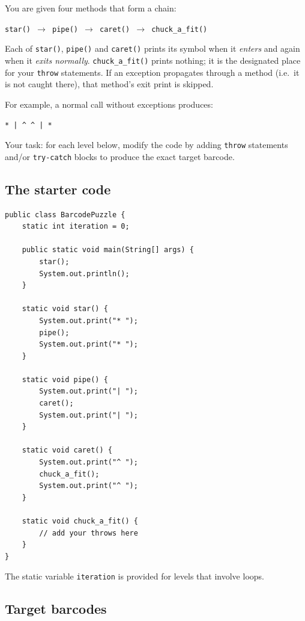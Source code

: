 \documentclass[twoside=false,DIV=14]{scrartcl}
\begin{document}
You are given four methods that form a chain:

\begin{center}
\texttt{star() $\rightarrow$ pipe() $\rightarrow$ caret() $\rightarrow$ chuck\_a\_fit()}
\end{center}

Each of \texttt{star()}, \texttt{pipe()} and \texttt{caret()} prints its symbol when it \emph{enters} and again when it \emph{exits normally}.  \texttt{chuck\_a\_fit()} prints nothing; it is the designated place for your \texttt{throw} statements.  If an exception propagates through a method (i.e.\ it is not caught there), that method's exit print is skipped.

For example, a normal call without exceptions produces:

\begin{center}
\texttt{* | \^{} \^{} | *}
\end{center}

Your task: for each level below, modify the code by adding \texttt{throw} statements and/or \texttt{try-catch} blocks to produce the exact target barcode.

\subsection*{The starter code}

\begin{lstlisting}
public class BarcodePuzzle {
    static int iteration = 0;

    public static void main(String[] args) {
        star();
        System.out.println();
    }

    static void star() {
        System.out.print("* ");
        pipe();
        System.out.print("* ");
    }

    static void pipe() {
        System.out.print("| ");
        caret();
        System.out.print("| ");
    }

    static void caret() {
        System.out.print("^ ");
        chuck_a_fit();
        System.out.print("^ ");
    }

    static void chuck_a_fit() {
        // add your throws here
    }
}
\end{lstlisting}

The static variable \texttt{iteration} is provided for levels that involve loops.

\subsection*{Target barcodes}
\end{document}
